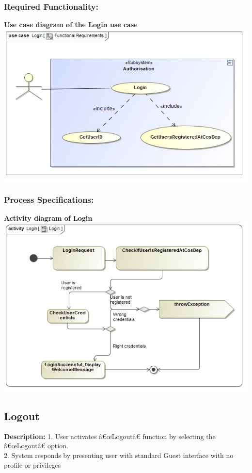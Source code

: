 \documentclass[a4paper,11pt]{article}
\begin{document}
\subsubsection{Required Functionality:} 
\textbf{Use case diagram of the Login use case}\\
\includegraphics[width=1\linewidth]{./Images/Author/Login.jpg}\\
\subsubsection{Process Specifications:} 
\textbf{Activity diagram of Login}\\ 
\includegraphics[width=1\linewidth]{./Images/Author/LoginAct.jpg}\\

\subsection{Logout}
\textbf{Description:}
1.	User activates â€œLogoutâ€ function by selecting the â€œLogoutâ€ option.\\
2.	System responds by presenting user with standard Guest interface with no profile or privileges\\
\end{document}
